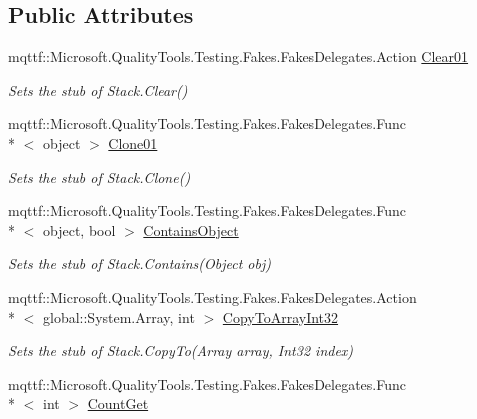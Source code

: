 \subsection*{Public Attributes}
\begin{DoxyCompactItemize}
\item 
mqttf\-::\-Microsoft.\-Quality\-Tools.\-Testing.\-Fakes.\-Fakes\-Delegates.\-Action \hyperlink{class_system_1_1_collections_1_1_fakes_1_1_stub_stack_a517d5202245ddbe3291f941eab54bd16}{Clear01}
\begin{DoxyCompactList}\small\item\em Sets the stub of Stack.\-Clear()\end{DoxyCompactList}\item 
mqttf\-::\-Microsoft.\-Quality\-Tools.\-Testing.\-Fakes.\-Fakes\-Delegates.\-Func\\*
$<$ object $>$ \hyperlink{class_system_1_1_collections_1_1_fakes_1_1_stub_stack_a7c0831c9c6c5a5071ba217f102ca0ad3}{Clone01}
\begin{DoxyCompactList}\small\item\em Sets the stub of Stack.\-Clone()\end{DoxyCompactList}\item 
mqttf\-::\-Microsoft.\-Quality\-Tools.\-Testing.\-Fakes.\-Fakes\-Delegates.\-Func\\*
$<$ object, bool $>$ \hyperlink{class_system_1_1_collections_1_1_fakes_1_1_stub_stack_aeebef1b2341ac93b0abf64c1ce3d7337}{Contains\-Object}
\begin{DoxyCompactList}\small\item\em Sets the stub of Stack.\-Contains(\-Object obj)\end{DoxyCompactList}\item 
mqttf\-::\-Microsoft.\-Quality\-Tools.\-Testing.\-Fakes.\-Fakes\-Delegates.\-Action\\*
$<$ global\-::\-System.\-Array, int $>$ \hyperlink{class_system_1_1_collections_1_1_fakes_1_1_stub_stack_a60ca620709e17ccb9c953c1523059cb0}{Copy\-To\-Array\-Int32}
\begin{DoxyCompactList}\small\item\em Sets the stub of Stack.\-Copy\-To(\-Array array, Int32 index)\end{DoxyCompactList}\item 
mqttf\-::\-Microsoft.\-Quality\-Tools.\-Testing.\-Fakes.\-Fakes\-Delegates.\-Func\\*
$<$ int $>$ \hyperlink{class_system_1_1_collections_1_1_fakes_1_1_stub_stack_a74b8c7f9cfe397338bf5708bbae44c46}{Count\-Get}

\end{DoxyCompactItemize}
